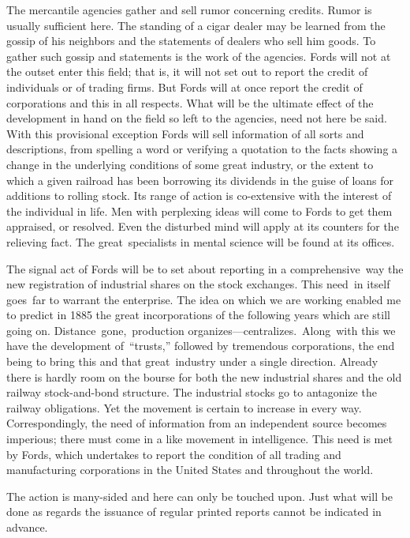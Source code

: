 \documentclass[twoside,symmetric,nobib,justified]{tufte-book}
\begin{document}
The mercantile agencies gather and sell rumor concerning credits. Rumor
is usually sufficient here. The standing of a cigar dealer may be
learned from the gossip of his neighbors and the statements of dealers
who sell him goods. To gather such gossip and statements is the work of
the agencies. Fords will not at the outset enter this field; that is, it
will not set out to report the credit of individuals or of trading
firms. But Fords will at once report the credit of corporations and this
in all respects. What will be the ultimate effect of the development in
hand on the field so left to the agencies, need not here be said. With
this provisional exception Fords will sell information of all sorts and
descriptions, from spelling a word or verifying a quotation to the facts
showing a change in the underlying conditions of some great industry, or
the extent to which a given railroad has been borrowing its dividends in
the guise of loans for additions to rolling stock. Its range of action
is co-extensive with the interest of the individual in life. Men with
perplexing ideas will come to Fords to get them appraised, or resolved.
Even the disturbed mind will apply at its counters for the relieving
fact. The great~specialists in mental science will be found at its
offices.~

The signal act of Fords will be to set about reporting in a
comprehensive~way the new registration of industrial shares on the stock
exchanges. This need~in itself goes~far to warrant the enterprise. The
idea on which we are working enabled me to predict in 1885 the great
incorporations of the following years which are still going on.
Distance~gone,~production organizes---centralizes.~Along~with this we
have the development of~``trusts,'' followed by tremendous corporations,
the end being to bring this and that great~industry under a single
direction. Already there is hardly room on the bourse for both the new
industrial shares and the old railway stock-and-bond structure. The
industrial stocks go to antagonize the railway obligations. Yet the
movement is certain to increase in every way. Correspondingly, the need
of information from an independent source becomes imperious; there must
come in a like movement in intelligence. This need is met by Fords,
which undertakes to report the condition of all trading and
manufacturing corporations in the United States and throughout the
world.~

The action is many-sided and here can only be touched upon. Just what
will be done as regards the issuance of regular printed reports cannot
be indicated in advance.~
\end{document}

